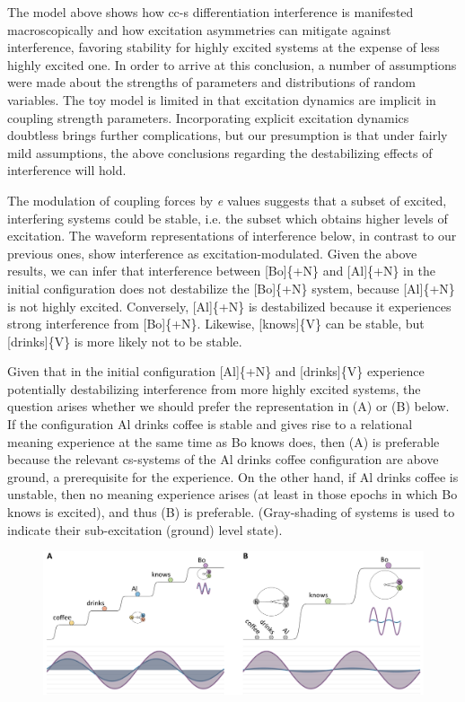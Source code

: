 The model above shows how cc-s differentiation interference is manifested macroscopically and how excitation asymmetries can mitigate against interference, favoring stability for highly excited systems at the expense of less highly excited one. In order to arrive at this conclusion, a number of assumptions were made about the strengths of parameters and distributions of random variables. The toy model is limited in that excitation dynamics are implicit in coupling strength parameters. Incorporating explicit excitation dynamics doubtless brings further complications, but our presumption is that under fairly mild assumptions, the above conclusions regarding the destabilizing effects of interference will hold.

  The modulation of coupling forces by \textit{e} values suggests that a subset of excited, interfering systems could be stable, i.e. the subset which obtains higher levels of excitation. The waveform representations of interference below, in contrast to our previous ones, show interference as excitation-modulated. Given the above results, we can infer that interference between [Bo]\{+N\} and [Al]\{+N\} in the initial configuration does not destabilize the [Bo]\{+N\} system, because [Al]\{+N\} is not highly excited. Conversely, [Al]\{+N\} is destabilized because it experiences strong interference from [Bo]\{+N\}. Likewise, [knows]\{V\} can be stable,  but [drinks]\{V\} is more likely not to be stable. 

  Given that in the initial configuration [Al]\{+N\} and [drinks]\{V\} experience potentially destabilizing interference from more highly excited systems, the question arises whether we should prefer the representation in (A) or (B) below. If the configuration {\textbar}Al drinks coffee{\textbar} is stable and gives rise to a relational meaning experience at the same time as {\textbar}Bo knows{\textbar} does, then (A) is preferable because the relevant cs-systems of the {\textbar}Al drinks coffee{\textbar} configuration are above ground, a prerequisite for the experience. On the other hand, if {\textbar}Al drinks coffee{\textbar} is unstable, then no meaning experience arises (at least in those epochs in which {\textbar}Bo knows{\textbar} is excited), and thus (B) is preferable. (Gray-shading of systems is used to indicate their sub-excitation (ground) level state).

  
\begin{figure}
\includegraphics[width=\textwidth]{figures/Tilsen-img95.png}
\caption{\missingcaption}
\label{fig:4:45}
\end{figure}

